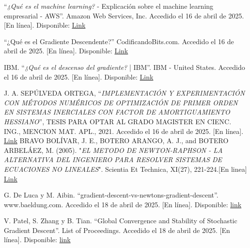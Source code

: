 \documentclass[conference]{IEEEtran}
\begin{document}

\begin{thebibliography}{1}

“\textit{¿Qué es el machine learning?} - Explicación sobre el machine learning empresarial - AWS”. Amazon Web Services, Inc. Accedido el 16 de abril de 2025. [En línea]. Disponible: 
\href{https://aws.amazon.com/es/what-is/machine-learning/}{Link}

``¿Qué es el Gradiente Descendente?'' CodificandoBits.com. 
Accedido el 16 de abril de 2025. [En línea]. Disponible: 
\href{https://codificandobits.com/blog/el-gradiente-descendente/}{Link}

IBM. “\textit{¿Qué es el descenso del gradiente?} | IBM”. IBM - United States. Accedido el 16 de abril de 2025. [En línea]. Disponible: \href{https://www.ibm.com/mx-es/think/topics/gradient-descent}{Link}

J. A. SEPÚLVEDA ORTEGA, “\textit{IMPLEMENTACIÓN Y EXPERIMENTACIÓN CON MÉTODOS NUMÉRICOS DE OPTIMIZACIÓN DE PRIMER ORDEN EN SISTEMAS INERCIALES CON FACTOR DE AMORTIGUAMIENTO HESSIANO}”, TESIS PARA OPTAR AL GRADO MAGISTER EN CIENC. ING., MENCION MAT. APL., 2021. Accedido el 16 de abril de 2025. [En línea].\\ 
\href{https://repositorio.uchile.cl/bitstream/handle/2250/181490/Implementacion-y-experimentacion-con-metodos-numericos-de-optimizacion-de-primer-orden-en-sistemas-inerciales-con-factor-de-amortiguamiento-hessiano.pdf?sequence=1}{Link}
BRAVO BOLÍVAR, J. E., BOTERO ARANGO, A. J., and BOTERO ARBELÁEZ, M.  (2005). "\textit{EL METODO DE NEWTON-RAPHSON - LA ALTERNATIVA DEL INGENIERO PARA RESOLVER SISTEMAS DE ECUACIONES NO LINEALES}". Scientia Et Technica, XI(27), 221-224.[En linea]\\
\href{https://www.redalyc.org/pdf/849/84911698041.pdf}{Link}

G. De Luca y M. Aibin. “gradient-descent-vs-newtons-gradient-descent”. www.baeldung.com. Accedido el 18 de abril de 2025. [En línea]. Disponible: 
\href{https://www.baeldung.com/cs/gradient-descent-vs-newtons-gradient-descent}{link}

V. Patel, S. Zhang y B. Tian. “Global Convergence and Stability of Stochastic Gradient Descent”. List of Proceedings. Accedido el 18 de abril de 2025. [En línea]. Disponible: 
\href{https://proceedings.neurips.cc/paper_files/paper/2022/file/ea05e4fc0299c27648c9985266abad47-Paper-Conference.pdf}{link}


\end{thebibliography}
\end{document}

